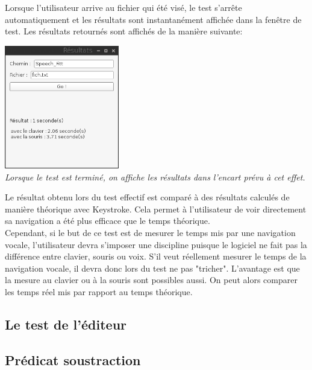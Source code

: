\documentclass[a4paper, 11pt]{report}
\begin{document}
		Lorsque l'utilisateur arrive au fichier qui été visé, le test s'arrête automatiquement et les résultats sont instantanément affichée dans la fenêtre de test. Les résultats retournés sont affichés de la manière suivante:\\
		\begin{center}
			\includegraphics[width=5cm]{test_finished}\\
			\emph{Lorsque le test est terminé, on affiche les résultats dans l'encart prévu à cet effet.\\}
		\end{center}
		
		Le résultat obtenu lors du test effectif est comparé à des résultats calculés de manière théorique avec Keystroke. Cela permet à l'utilisateur de voir directement sa navigation a été plus efficace que le temps théorique.\\
	Cependant, si le but de ce test est de mesurer le temps mis par une navigation vocale, l'utilisateur devra s'imposer une discipline puisque le logiciel ne fait pas la différence entre clavier, souris ou voix. S'il veut réellement mesurer le temps de la navigation vocale, il devra donc lors du test ne pas "tricher". L'avantage est que la mesure au clavier ou à la souris sont possibles aussi. On peut alors comparer les temps réel mis par rapport au temps théorique.
	
	
		\section{Le test de l'éditeur}
		
		
	
	
	
	
	
	
		
	\newpage	
		
	\tableofcontents

\begin{appendices}

    \chapter{Prédicat soustraction}



\end{appendices} 




		
\end{document}
